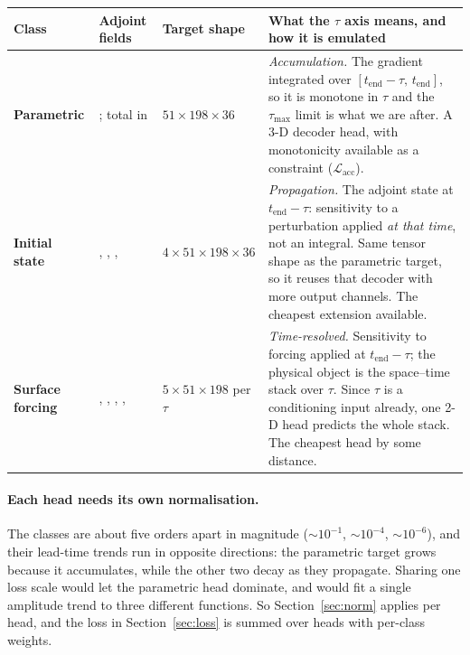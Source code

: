 \begin{center}
\begin{tabularx}{\textwidth}{@{}Y{0.60}Y{0.75}Y{0.70}Y{1.95}@{}}
\toprule
\textbf{Class} & \textbf{Adjoint fields} & \textbf{Target shape} &
\textbf{What the $\tau$ axis means, and how it is emulated}\\
\midrule
\textbf{Parametric}
  & ; total in 
  & $51{\times}198{\times}36$
  & \emph{Accumulation.} The gradient integrated over
    $[t_{\text{end}}-\tau,\,t_{\text{end}}]$, so it is monotone in $\tau$ and
    the $\tau_{\max}$ limit is what we are after. A 3-D decoder head, with
    monotonicity available as a constraint ($\mathcal{L}_{\text{acc}}$).\\
\textbf{Initial state}
  & , , , 
  & $4{\times}51{\times}198{\times}36$
  & \emph{Propagation.} The adjoint state at $t_{\text{end}}-\tau$: sensitivity
    to a perturbation applied \emph{at that time}, not an integral. Same tensor
    shape as the parametric target, so it reuses that decoder with more output
    channels. The cheapest extension available.\\
\textbf{Surface forcing}
  & , , , ,
  & $5{\times}51{\times}198$ per $\tau$
  & \emph{Time-resolved.} Sensitivity to forcing applied at
    $t_{\text{end}}-\tau$; the physical object is the space--time stack over
    $\tau$. Since $\tau$ is a conditioning input already, one 2-D head predicts
    the whole stack. The cheapest head by some distance.\\
\bottomrule
\end{tabularx}
\end{center}

\paragraph{Each head needs its own normalisation.}
The classes are about five orders apart in magnitude ($\sim\!10^{-1}$,
$\sim\!10^{-4}$, $\sim\!10^{-6}$), and their lead-time trends run in opposite
directions: the parametric target grows because it accumulates, while the other
two decay as they propagate. Sharing one loss scale would let the parametric
head dominate, and would fit a single amplitude trend to three different
functions. So Section~\ref{sec:norm} applies per head, and the loss in
Section~\ref{sec:loss} is summed over heads with per-class weights.

